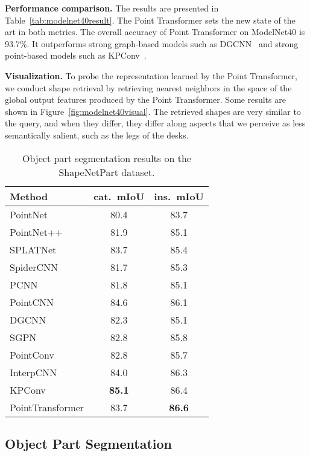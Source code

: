 \documentclass[final]{cvpr}
\newcommand\mypara[1]{\vspace{1mm}\noindent\textbf{#1}}
\begin{document}
\mypara{Performance comparison.}
The results are presented in Table~\ref{tab:modelnet40result}. The Point Transformer sets the new state of the art in both metrics. The overall accuracy of Point Transformer on ModelNet40 is 93.7\%. It outperforms strong graph-based models such as DGCNN~\cite{wang2019dgcnn} and strong point-based models such as KPConv~\cite{thomas2019kpconv}.

\mypara{Visualization.}
To probe the representation learned by the Point Transformer, we conduct shape retrieval by retrieving nearest neighbors in the space of the global output features produced by the Point Transformer. Some results are shown in Figure~\ref{fig:modelnet40visual}. The retrieved shapes are very similar to the query, and when they differ, they differ along aspects that we perceive as less semantically salient, such as the legs of the desks.

\begin{table}[t]
	\centering
	\begin{tabular}{ l | c c}
		\toprule[1pt]
		Method & cat.\ mIoU & ins.\ mIoU \\
		\hline
		PointNet~\cite{qi2017pointnet} & 80.4 & 83.7 \\
		PointNet++~\cite{qi2017pointnet2} & 81.9 & 85.1 \\
		SPLATNet & 83.7 & 85.4 \\
		SpiderCNN~\cite{xu2018spidercnn}& 81.7 & 85.3 \\
		PCNN~\cite{wang2018pccn} & 81.8 & 85.1 \\
		PointCNN~\cite{li2018pointcnn} & 84.6 & 86.1 \\
		DGCNN~\cite{wang2019dgcnn} & 82.3 & 85.1 \\
		SGPN~\cite{wang2018sgpn} & 82.8 & 85.8 \\
		PointConv~\cite{wu2019pointconv} & 82.8 & 85.7 \\
		InterpCNN~\cite{mao2019interpolated} & 84.0 & 86.3 \\
		KPConv~\cite{thomas2019kpconv} & \textbf{85.1} & 86.4 \\
		\hline
		PointTransformer & 83.7 & \textbf{86.6} \\
		\bottomrule[1pt]
	\end{tabular}
	\caption{Object part segmentation results on the ShapeNetPart dataset.}
	\label{tab:shapenetpartresult}
	\vspace{-2mm}
\end{table}

\subsection{Object Part Segmentation}
\end{document}
